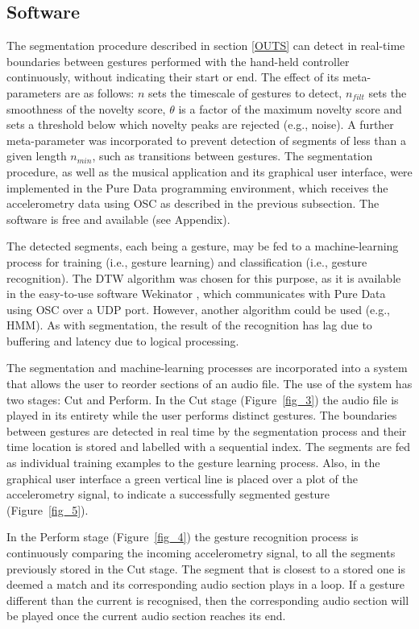 \documentclass{nime-alternate_ADJ} %
\begin{document}
\subsection{Software}

The segmentation procedure described in section \ref{OUTS} can detect in real-time boundaries between gestures performed with the hand-held controller continuously, without indicating their start or end.  The effect of its meta-parameters are as follows: $n$  sets the timescale of gestures to detect, $n_{filt}$ sets the smoothness of the novelty score, $\theta$ is a factor of the maximum novelty score and sets a threshold below which novelty peaks are rejected (e.g., noise). A further meta-parameter was incorporated to prevent detection of segments of less than a given length $n_{min}$, such as transitions between gestures. The segmentation procedure, as well as  the musical application and its graphical user interface, were implemented in the Pure Data programming environment, which receives the accelerometry data using OSC as described in the previous subsection. The software is free and available (see Appendix).  

The detected segments, each being a gesture, may be fed to a machine-learning process for training (i.e., gesture learning) and classification (i.e., gesture recognition). The DTW algorithm was chosen for this purpose, as it is available in the easy-to-use software Wekinator \cite{Fiebrink_etal_2009, Wekinator_website}, which communicates with Pure Data using OSC over a UDP port. However, another algorithm could be used (e.g., HMM). As with segmentation, the result of the recognition has lag due to buffering and latency due to logical processing.

The segmentation and machine-learning processes are incorporated into a system that allows the user to reorder sections of an audio file. The use of the system has two stages: Cut and Perform. In the Cut stage (Figure~\ref{fig_3}) the audio file is played in its entirety while the user performs distinct gestures. The boundaries between gestures are detected in real time by the segmentation process and their time location is stored and labelled with a sequential index. The segments are fed as individual training examples to the gesture learning process. Also, in the graphical user interface a green vertical line is placed over a plot of the accelerometry signal, to indicate a successfully segmented gesture (Figure~\ref{fig_5}).

In the Perform stage (Figure~\ref{fig_4}) the gesture recognition process is continuously comparing the incoming accelerometry signal, to all the segments previously stored in the Cut stage. The segment that is closest to a stored one is deemed a match and its corresponding audio section plays in a loop. If a gesture different than the current is recognised, then the corresponding audio section will be played once the current audio section reaches its end.
\end{document}
